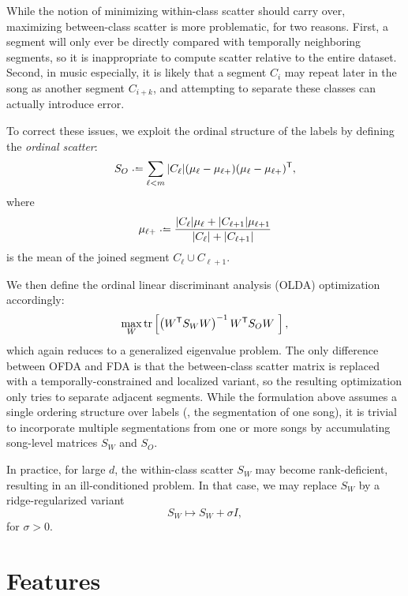 \documentclass{article}
\begin{document}
While the notion of minimizing within-class scatter should carry over, maximizing between-class scatter is more problematic, for two reasons.
First, a segment will only ever be directly compared with temporally neighboring segments, so it is inappropriate to compute scatter relative to the entire dataset.
Second, in music especially, it is likely that a segment $C_i$ may repeat later in the song as another segment $C_{i+k}$, and attempting to separate these classes can actually
introduce error.

To correct these issues, we exploit the ordinal structure of the labels by defining the \emph{ordinal scatter}:
\[
S_O \defeq \sum_{\ell < m} |C_\ell| (\mu_\ell - \mu_{\ell+})(\mu_\ell - \mu_{\ell+})\trans,
\]
where
\[
\mu_{\ell+} \defeq \frac{|C_\ell|\mu_\ell + |C_{\ell+1}|\mu_{\ell+1}}{|C_\ell| + |C_{\ell+1}|}
\]
is the mean of the joined segment $C_\ell \cup C_{\ell+1}$.

We then define the ordinal linear discriminant analysis (OLDA) optimization accordingly:
\[
\max_W \trace\left[\left(W\trans S_W W\right)^{-1} W\trans S_O W\ \right],
\]
which again reduces to a generalized eigenvalue problem.  The only difference between OFDA and FDA is that the between-class scatter matrix is replaced with a temporally-constrained
and localized variant, so the resulting optimization only tries to separate adjacent segments.  While the formulation above assumes a single ordering structure over labels (\ie, the
segmentation of one song), it is trivial to incorporate multiple segmentations from one or more songs by accumulating song-level matrices $S_W$ and $S_O$.

In practice, for large $d$, the within-class scatter $S_W$ may become rank-deficient, resulting in an ill-conditioned problem.  In that case, we may replace $S_W$ by a
ridge-regularized variant
\[
S_W \mapsto S_W + \sigma I,
\]
for $\sigma > 0$.
\section{Features}
\end{document}
